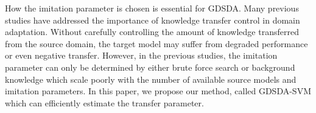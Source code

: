 How the imitation parameter is chosen is essential for GDSDA.
Many previous studies have addressed the importance of knowledge transfer control in domain adaptation\cite{duan2012learning,duan2012visual}. Without carefully controlling the amount of knowledge transferred from the source domain, the target model may suffer from degraded performance or even negative transfer\cite{pan2010survey}. However, in the previous studies, the imitation parameter can only be determined by either brute force search\cite{lopez2015unifying} or background knowledge\cite{Tzeng_2015_ICCV} which scale poorly with the number of available source models and imitation parameters.
In this paper, we propose our method, called GDSDA-SVM which can efficiently estimate the transfer parameter.



